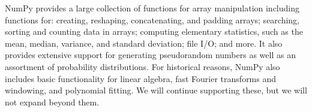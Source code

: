 NumPy provides a large collection of functions for array manipulation
including functions for: creating, reshaping, concatenating, and padding arrays;
searching, sorting and counting data
in arrays; computing elementary statistics, such as the mean, median,
variance, and standard deviation; file I/O; and more.
It also provides extensive support for generating pseudorandom numbers
as well as an assortment of probability distributions.
For historical reasons, NumPy also includes basic functionality for
linear algebra, fast Fourier transforms and windowing,
and polynomial fitting.
We will continue supporting these, but we will not expand beyond them.

%
%
%

